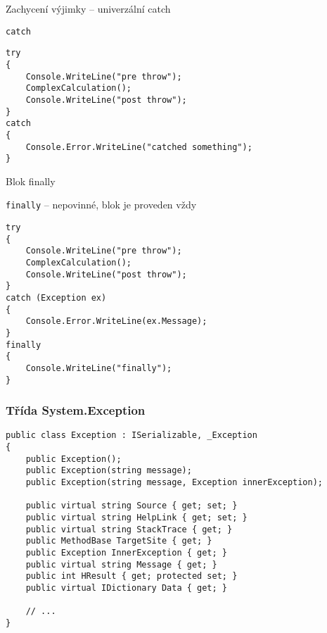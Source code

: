 \begin{frame}[fragile]
\begin{bitemize}{Zachycení výjimky -- univerzální catch}
\item \lstinline|catch|
\end{bitemize}
\vfill
\begin{yesblock}
\begin{lstlisting}
try
{
    Console.WriteLine("pre throw");
    ComplexCalculation();
    Console.WriteLine("post throw");
}
catch 
{
    Console.Error.WriteLine("catched something");
}
\end{lstlisting}
\end{yesblock}
\end{frame}


\begin{frame}[fragile]
\begin{bitemize}{Blok finally}
\item \lstinline|finally| -- nepovinné, blok je proveden vždy
\end{bitemize}
\vfill
\begin{yesblock}
\begin{lstlisting}
try
{
    Console.WriteLine("pre throw");
    ComplexCalculation();
    Console.WriteLine("post throw");
}
catch (Exception ex)
{
    Console.Error.WriteLine(ex.Message);
}
finally
{
    Console.WriteLine("finally");
}
\end{lstlisting}
\end{yesblock}
\end{frame}





\begin{frame}[fragile]
\frametitle{Třída System.Exception}
\begin{noteblock}{}
\begin{lstlisting}
public class Exception : ISerializable, _Exception
{
    public Exception();
    public Exception(string message);
    public Exception(string message, Exception innerException);

    public virtual string Source { get; set; }
    public virtual string HelpLink { get; set; }
    public virtual string StackTrace { get; }
    public MethodBase TargetSite { get; }
    public Exception InnerException { get; }
    public virtual string Message { get; }
    public int HResult { get; protected set; }
    public virtual IDictionary Data { get; }
    
    // ...
}
\end{lstlisting}
\end{noteblock}

\end{frame}



